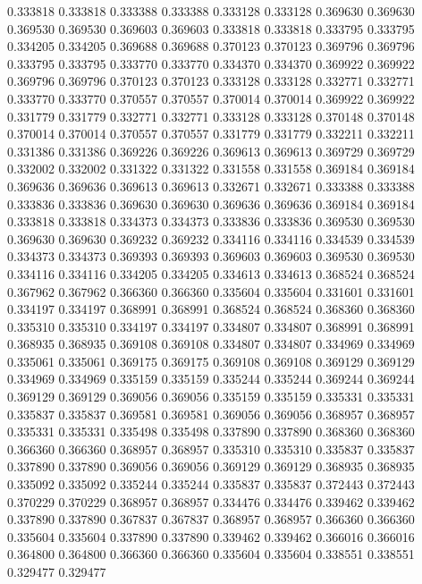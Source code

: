 0.333818 0.333818 0.333388 0.333388 0.333128 0.333128 0.369630 0.369630 0.369530 0.369530 0.369603 0.369603 0.333818 0.333818 0.333795 0.333795 0.334205 0.334205 0.369688 0.369688 0.370123 0.370123 0.369796 0.369796 0.333795 0.333795 0.333770 0.333770 0.334370 0.334370 0.369922 0.369922 0.369796 0.369796 0.370123 0.370123 0.333128 0.333128 0.332771 0.332771 0.333770 0.333770 0.370557 0.370557 0.370014 0.370014 0.369922 0.369922 0.331779 0.331779 0.332771 0.332771 0.333128 0.333128 0.370148 0.370148 0.370014 0.370014 0.370557 0.370557 0.331779 0.331779 0.332211 0.332211 0.331386 0.331386 0.369226 0.369226 0.369613 0.369613 0.369729 0.369729 0.332002 0.332002 0.331322 0.331322 0.331558 0.331558 0.369184 0.369184 0.369636 0.369636 0.369613 0.369613 0.332671 0.332671 0.333388 0.333388 0.333836 0.333836 0.369630 0.369630 0.369636 0.369636 0.369184 0.369184 0.333818 0.333818 0.334373 0.334373 0.333836 0.333836 0.369530 0.369530 0.369630 0.369630 0.369232 0.369232 0.334116 0.334116 0.334539 0.334539 0.334373 0.334373 0.369393 0.369393 0.369603 0.369603 0.369530 0.369530 0.334116 0.334116 0.334205 0.334205 0.334613 0.334613 0.368524 0.368524 0.367962 0.367962 0.366360 0.366360 0.335604 0.335604 0.331601 0.331601 0.334197 0.334197 0.368991 0.368991 0.368524 0.368524 0.368360 0.368360 0.335310 0.335310 0.334197 0.334197 0.334807 0.334807 0.368991 0.368991 0.368935 0.368935 0.369108 0.369108 0.334807 0.334807 0.334969 0.334969 0.335061 0.335061 0.369175 0.369175 0.369108 0.369108 0.369129 0.369129 0.334969 0.334969 0.335159 0.335159 0.335244 0.335244 0.369244 0.369244 0.369129 0.369129 0.369056 0.369056 0.335159 0.335159 0.335331 0.335331 0.335837 0.335837 0.369581 0.369581 0.369056 0.369056 0.368957 0.368957 0.335331 0.335331 0.335498 0.335498 0.337890 0.337890 0.368360 0.368360 0.366360 0.366360 0.368957 0.368957 0.335310 0.335310 0.335837 0.335837 0.337890 0.337890 0.369056 0.369056 0.369129 0.369129 0.368935 0.368935 0.335092 0.335092 0.335244 0.335244 0.335837 0.335837 0.372443 0.372443 0.370229 0.370229 0.368957 0.368957 0.334476 0.334476 0.339462 0.339462 0.337890 0.337890 0.367837 0.367837 0.368957 0.368957 0.366360 0.366360 0.335604 0.335604 0.337890 0.337890 0.339462 0.339462 0.366016 0.366016 0.364800 0.364800 0.366360 0.366360 0.335604 0.335604 0.338551 0.338551 0.329477 0.329477 